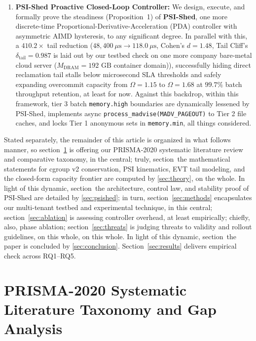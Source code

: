 \documentclass[pdflatex,sn-mathphys,Numbered]{sn-jnl}
\begin{document}
\begin{enumerate}
    \item \textbf{PSI-Shed Proactive Closed-Loop Controller:} We design, execute, and formally prove the steadiness (Proposition~1) of \textbf{PSI-Shed}, one more discrete-time Proportional-Derivative-Acceleration (PDA) controller with asymmetric AIMD hysteresis, to any significant degree. In parallel with this, a $410.2\times$ tail reduction ($48,400\ \mu\text{s} \to 118.0\ \mu\text{s}$, Cohen's $d = 1.48$, Tail Cliff's $\delta_{\text{tail}} = 0.987$ is laid out by our testbed check on one more company bare-metal cloud server ($M_{\text{DRAM}} = 192\text{ GB}$ container domain)), successfully hiding direct reclamation tail stalls below microsecond SLA thresholds and safely expanding overcommit capacity from $\Omega = 1.15$ to $\Omega = 1.68$ at $99.7\%$ batch throughput retention, at least for now. Against this backdrop, within this framework, tier 3 batch \texttt{memory.high} boundaries are dynamically lessened by PSI-Shed, implements async \texttt{process\_madvise(MADV\_PAGEOUT)} to Tier 2 file caches, and locks Tier 1 anonymous sets in \texttt{memory.min}, all things considered.
\end{enumerate}

Stated separately, the remainder of this article is organized in what follows manner, so section~\ref{sec:related} is offering our PRISMA-2020 systematic literature review and comparative taxonomy, in the central; truly, section~the mathematical statements for cgroup v2 conservation, PSI kinematics, EVT tail modeling, and the closed-form capacity frontier are computed by \ref{sec:theory}, on the whole. In light of this dynamic, section~the architecture, control law, and stability proof of PSI-Shed are detailed by \ref{sec:psished}; in turn, section~\ref{sec:methods} encapsulates our multi-tenant testbed and experimental technique, in this central; section~\ref{sec:ablation} is assessing controller overhead, at least empirically; chiefly, also, phase ablation; section~\ref{sec:threats} is judging threats to validity and rollout guidelines, on this whole, on this whole. In light of this dynamic, section~the paper is concluded by \ref{sec:conclusion}. Section~\ref{sec:results} delivers empirical check across RQ1--RQ5.

\section{PRISMA-2020 Systematic Literature Taxonomy and Gap Analysis}
\label{sec:related}
\end{document}
